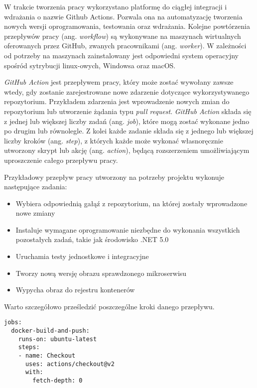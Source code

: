 W trakcie tworzenia pracy wykorzystano platformę do ciągłej integracji i wdrażania 
o nazwie Github Actions. Pozwala ona na automatyzację tworzenia nowych wersji 
oprogramowania, testowania oraz wdrażania. Kolejne powtórzenia przepływów pracy 
(ang. \textit{workflow}) są wykonywane na maszynach wirtualnych oferowanych przez 
GitHub, zwanych pracownikami (ang. \textit{worker}). W zależności od potrzeby na maszynach 
zainstalowany jest odpowiedni system operacyjny spośród sytrybucji 
linux-owych, Windowsa oraz macOS.

\textit{GitHub Action} jest przepływem pracy, który może zostać wywołany zawsze wtedy, gdy 
zostanie zarejestrowane nowe zdarzenie dotyczące wykorzystywanego repozytorium. 
Przykładem zdarzenia jest wprowadzenie nowych zmian do repozytorium lub utworzenie 
żądania typu \textit{pull request}. \textit{GitHub Action} składa się z jednej lub większej liczby 
zadań (ang. \textit{job}), które mogą zostać wykonane jedno po drugim lub równolegle. Z kolei 
każde zadanie składa się z jednego lub większej liczby kroków (ang. \textit{step}), z których 
każde może wykonać własnoręcznie utworzony skrypt lub akcję (ang. \textit{action}), będącą 
rozszerzeniem umożliwiającym uproszczenie całego przepływu pracy.

Przykładowy przepływ pracy utworzony na potrzeby projektu wykonuje następujące zadania:

\begin{itemize} %
    \item Wybiera odpowiednią gałąź z repozytorium, na której zostały wprowadzone 
    nowe zmiany
    \item Instaluje wymagane oprogramowanie niezbędne do wykonania wszystkich 
    pozostałych zadań, takie jak środowisko .NET 5.0
    \item Uruchamia testy jednostkowe i integracyjne
    \item Tworzy nową wersję obrazu sprawdzonego mikroserwisu
    \item Wypycha obraz do rejestru kontenerów
\end{itemize}

Warto szczegółowo prześledzić poszczególne kroki danego przepływu.

\begin{lstlisting}
jobs:
  docker-build-and-push:
    runs-on: ubuntu-latest
    steps:
    - name: Checkout
      uses: actions/checkout@v2
      with:
        fetch-depth: 0
\end{lstlisting}

